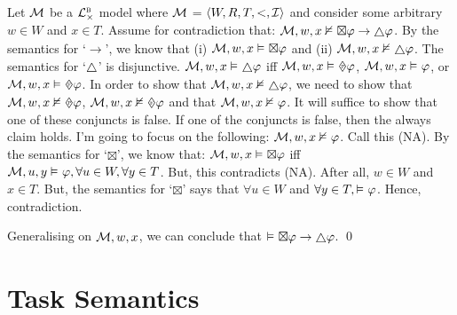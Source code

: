 \documentclass[a4paper, 11pt]{article}                  %
\begin{document}
\begin{enumerate}
{        Let $\mathcal{M}$ be a $\mathcal{L}^{\textsc{b}}_\times$ model where $\mathcal{M}$ = $\langle W,R,T,<,\mathcal{I}\rangle$ and consider some arbitrary $w \in W$ and $x \in T$. 
       Assume for contradiction that: $\M, w, x \nMLmodels \boxtimes \metaA \rightarrow \always \metaA$. 
       By the semantics for `$\rightarrow$', we know that (i) $\mathcal{M}, w, x \vDash_{} \boxtimes \varphi$ and (ii) $\M, w, x \nMLmodels \always \metaA$. 
       The semantics for `$\always$' is disjunctive. $\M, w, x \MLmodels \always \metaA$ iff $\M, w, x \MLmodels \past \metaA$, $\mathcal{M}, w, x  \vDash_{} \varphi$, or $\M, w, x \MLmodels \future \metaA$. 
       In order to show that $\M, w, x \nMLmodels \always \metaA$, we need to show that $\M, w, x \nMLmodels \past \metaA$, $\M, w, x \nMLmodels \future \metaA$ and that $\mathcal{M}, w, x \nvDash_{} \varphi$. 
       It will suffice to show that one of these conjuncts is false. If one of the conjuncts is false, then the always claim holds. I'm going to focus on the following: $\mathcal{M}, w, x \nvDash_{} \varphi$. Call this (NA).
       By the semantics for `$\boxtimes$', we know that: $\mathcal{M}, w, x \vDash_{} \boxtimes\varphi$ iff $\mathcal{M}, u, y \vDash_{} \varphi, \forall u \in W, \forall y \in T$. But, this contradicts (NA). After all, $w \in W$ and $x \in T$. But, the semantics for `$\boxtimes$' says that $\forall u \in W$ and $\forall y \in T, \vDash_{} \varphi$. 
       Hence, contradiction. 

       Generalising on $\mathcal{M}, w, x$, we can conclude that $\MLmodels \boxtimes \metaA \rightarrow \always \metaA$. 
       \qed
       }

\end{enumerate}





\section{Task Semantics}
\end{document}
